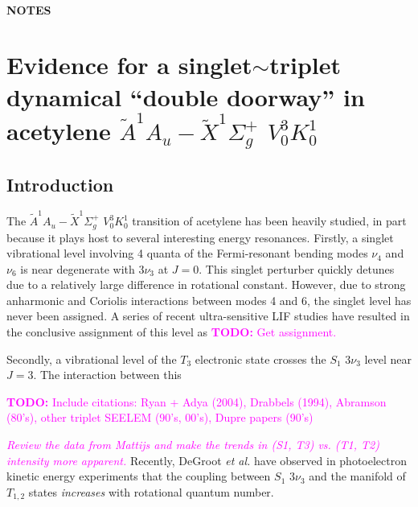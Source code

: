 \documentclass[12pt]{mitthesis}
\newcommand{\TODO} [1]{\textcolor{magenta}{\textbf{TODO:} #1}}
\newcommand{\POINT}[1]{\textcolor{magenta}{\emph{#1}}}
\begin{document}
\tableofcontents
\clearpage

\subsubsection*{NOTES}
\clearpage

\chapter{Evidence for a singlet$\sim$triplet dynamical ``double
  doorway'' in acetylene $\tilde{A} ^1A_u-\tilde{X}^1\Sigma^+_g$
  $V^3_0K^1_0$}

\section{Introduction}
The $\tilde{A} ^1A_u-\tilde{X}^1\Sigma^+_g$ $V^3_0K^1_0$ transition of
acetylene has been heavily studied, in part because it plays host to
several interesting energy resonances.  Firstly, a singlet vibrational
level involving 4 quanta of the Fermi-resonant bending modes $\nu_4$
and $\nu_6$ is near degenerate with $3\nu_3$ at $J=0$.  This singlet
perturber quickly detunes due to a relatively large difference in
rotational constant.  However, due to strong anharmonic and Coriolis
interactions between modes 4 and 6, the singlet level has never been
assigned.  A series of recent ultra-sensitive LIF studies have
resulted in the conclusive assignment of this level as \TODO{Get
  assignment.}

Secondly, a vibrational level of the $T_3$ electronic state crosses
the $S_1$ $3\nu_3$ level near $J=3$.  The interaction between this

\TODO{Include citations: Ryan + Adya (2004), Drabbels (1994), Abramson
  (80's), other triplet SEELEM (90's, 00's), Dupre papers (90's)}

\POINT{Review the data from Mattijs and make the trends in (S1, T3)
  vs. (T1, T2) intensity more apparent.}  Recently, DeGroot \emph{et
  al.} have observed in photoelectron kinetic energy experiments that
the coupling between $S_1$ $3\nu_3$ and the manifold of $T_{1,2}$
states \emph{increases} with rotational quantum number.
\end{document}
